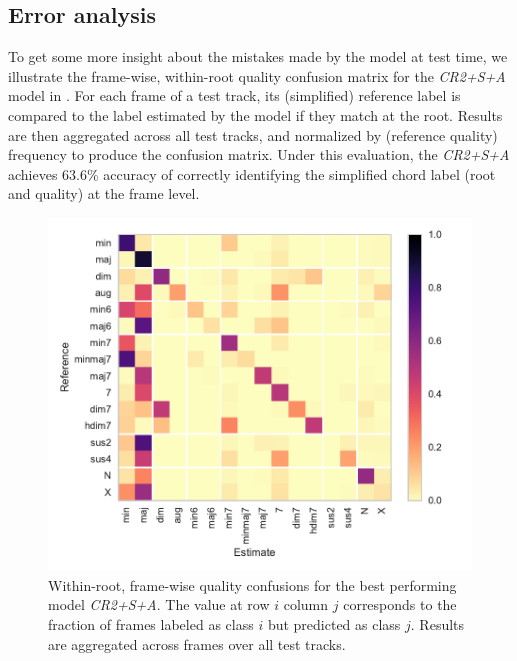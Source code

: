 \documentclass{article}
\begin{document}
\subsection{Error analysis}

To get some more insight about the mistakes made by the model at test time, we illustrate the frame-wise, within-root quality confusion matrix for the \emph{CR2+S+A} model in .
For each frame of a test track, its (simplified) reference label is compared to the label estimated by the model if they match at the root.
Results are then aggregated across all test tracks, and normalized by (reference quality) frequency to produce the confusion matrix.
Under this evaluation, the \emph{CR2+S+A} achieves 63.6\% accuracy of correctly identifying the simplified chord label (root and quality) at the frame level.

\begin{figure}
    \centering
    \includegraphics[width=\columnwidth]{qualconf}
    \caption{Within-root, frame-wise quality confusions for the best performing model \emph{CR2+S+A}.
    The value at row $i$ column $j$ corresponds to the fraction of frames labeled as class $i$ but predicted as class $j$.
    Results are aggregated across frames over all test tracks.\label{fig:confusion}}
\end{figure}
\end{document}
